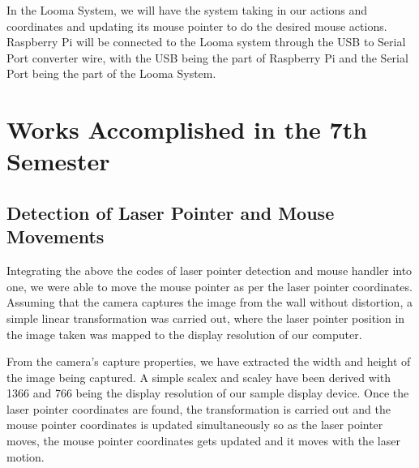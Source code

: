 \documentclass[12pt, a4paper]{article}
\begin{document}
In the Looma System, we will have the system taking in our actions and coordinates and updating its mouse pointer to do the desired mouse actions. Raspberry Pi will be connected to the Looma system through the USB to Serial Port converter wire, with the USB being the part of Raspberry Pi and the Serial Port being the part of the Looma System.

\newpage
\section{Works Accomplished in the 7th Semester}
\subsection{Detection of Laser Pointer and Mouse Movements}
	Integrating the above the codes of laser pointer detection and mouse handler into one, we were able to move the mouse pointer as per the laser pointer coordinates. Assuming that the camera captures the image from the wall without distortion, a simple linear transformation was carried out, where the laser pointer position in the image taken was mapped to the display resolution of our computer. 

	From the camera's capture properties, we have extracted the width and height of the image being captured. A simple scalex and scaley have been derived with 1366 and 766 being the display resolution of our sample display device. Once the laser pointer coordinates are found, the transformation is carried out and the mouse pointer coordinates is updated simultaneously so as the laser pointer moves, the mouse pointer coordinates gets updated and it moves with the laser motion. 
	
\end{document}
